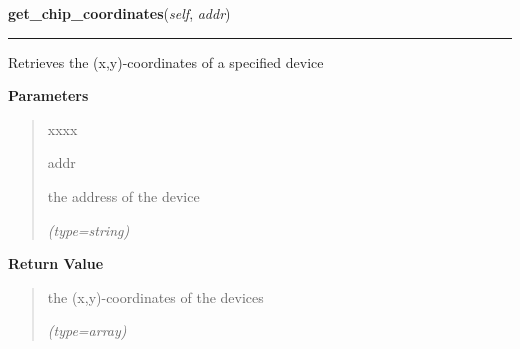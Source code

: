 \hspace{.8\funcindent}\begin{boxedminipage}{\funcwidth}

    \raggedright \textbf{get\_chip\_coordinates}(\textit{self}, \textit{addr})

    \vspace{-1.5ex}

    \rule{\textwidth}{0.5\fboxrule}
\setlength{\parskip}{2ex}
    Retrieves the (x,y)-coordinates of a specified device

\setlength{\parskip}{1ex}
      \textbf{Parameters}
      \vspace{-1ex}

      \begin{quote}
        \begin{Ventry}{xxxx}

          \item[addr]

          the address of the device

            {\it (type=string)}

        \end{Ventry}

      \end{quote}

      \textbf{Return Value}
    \vspace{-1ex}

      \begin{quote}
      the (x,y)-coordinates of the devices

      {\it (type=array)}

      \end{quote}

    \end{boxedminipage}

    \label{DBE:DBE:get_chips_xml}

    \vspace{0.5ex}

